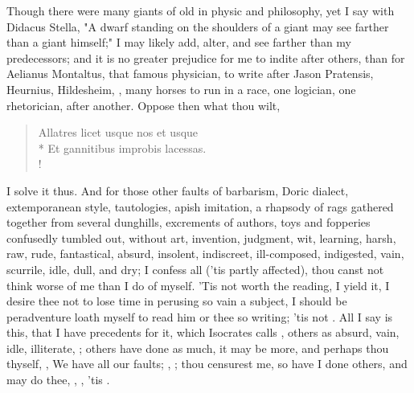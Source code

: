 
Though there were many giants of old in physic and philosophy, yet I say with
Didacus Stella, "A dwarf standing on the shoulders of a
giant may see farther than a giant himself;" I may likely add, alter, and see
farther than my predecessors; and it is no greater prejudice for me to indite
after others, than for Aelianus Montaltus, that famous physician, to write
 after Jason Pratensis, Heurnius,
Hildesheim, \etc{}, many horses to run in a race, one logician, one
rhetorician, after another. Oppose then what thou wilt,

\begin{latin}
\begin{verse}%
Allatres licet usque nos et usque\\*
Et gannitibus improbis lacessas.\\!
\end{verse}%
\end{latin}

I solve it thus. And for those other faults of barbarism,
Doric dialect, extemporanean style, tautologies, apish
imitation, a rhapsody of rags gathered together from several dunghills,
excrements of authors, toys and fopperies confusedly tumbled out, without art,
invention, judgment, wit, learning, harsh, raw, rude, fantastical, absurd,
insolent, indiscreet, ill-composed, indigested, vain, scurrile, idle, dull, and
dry; I confess all ('tis partly affected), thou canst not think worse of me
than I do of myself. 'Tis not worth the reading, I yield it, I desire thee not
to lose time in perusing so vain a subject, I should be peradventure loath
myself to read him or thee so writing; 'tis not . All I say
is this, that I have precedents for it, which Isocrates
calls , others as absurd, vain, idle, illiterate,
\etc{} ; others have done as much, it may be
more, and perhaps thou thyself, , \etc{} We have all our
faults; , \etc{}; thou
censurest me, so have I done others, and may do thee, ,
\etc{}, 'tis .

